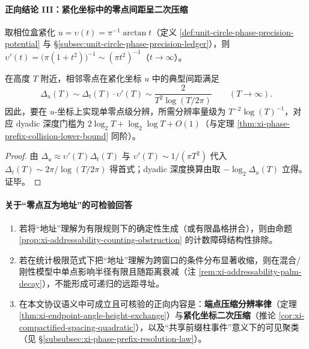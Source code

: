 \paragraph{正向结论 III：紧化坐标中的零点间距呈二次压缩}
取相位盒紧化 \(u=\upsilon(t)=\pi^{-1}\arctan t\)（定义 \ref{def:unit-circle-phase-precision-potential} 与 \S\ref{subsec:unit-circle-phase-precision-ledger}），则
\(
\upsilon'(t)=\bigl(\pi(1+t^2)\bigr)^{-1}\sim (\pi t^2)^{-1}
\)（\(t\to\infty\)）。
\begin{corollary}[紧化坐标的二次分辨率压缩律]\label{cor:xi-compactified-spacing-quadratic}
在高度 \(T\) 附近，相邻零点在紧化坐标 \(u\) 中的典型间距满足
\[
\Delta_u(T)\sim \Delta_t(T)\cdot \upsilon'(T)\sim \frac{2}{T^2\log(T/2\pi)}
\qquad(T\to\infty).
\]
因此，要在 \(u\)-坐标上实现单零点级分辨，所需分辨率量级为 \(T^{-2}\log(T)^{-1}\)，对应 dyadic 深度门槛为 \(2\log_2 T+\log_2\log T+O(1)\)（与定理 \ref{thm:xi-phase-prefix-collision-lower-bound} 同阶）。
\end{corollary}
\begin{proof}
由 \(\Delta_u\approx \upsilon'(T)\Delta_t(T)\) 与 \(\upsilon'(T)\sim 1/(\pi T^2)\) 代入 \(\Delta_t(T)\sim 2\pi/\log(T/2\pi)\) 得首式；dyadic 深度换算由取 \(-\log_2\Delta_u(T)\) 立得。证毕。
\end{proof}

\paragraph{关于“零点互为地址”的可检验回答}
\begin{enumerate}
  \item 若将“地址”理解为有限规则下的确定性生成（或有限晶格拼合），则由命题 \ref{prop:xi-addressability-counting-obstruction} 的计数障碍结构性排除。
  \item 若在统计极限范式下把“地址”理解为跨窗口的条件分布显著收缩，则在混合/刚性模型中单点影响半径有限且随距离衰减（注 \ref{rem:xi-addressability-palm-decay}），不能形成可递归的远距寻址。
  \item 在本文协议语义中可成立且可核验的正向内容是：\textbf{端点压缩分辨率律}（定理 \ref{thm:xi-endpoint-angle-height-exchange}）与\textbf{紧化坐标二次压缩}（推论 \ref{cor:xi-compactified-spacing-quadratic}），以及“共享前缀柱事件”意义下的可见聚类（见 \S\ref{subsubsec:xi-phase-prefix-resolution-law}）。
\end{enumerate}

\endinput
